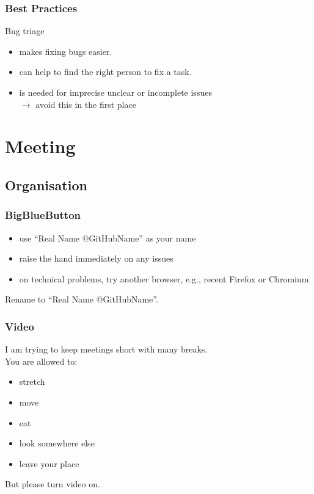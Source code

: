 \begin{frame}
	\frametitle{Best Practices}

	Bug triage
	\begin{itemize}
		\item makes fixing bugs easier.
		\item can help to find the right person to fix a task.
		\item is needed for imprecise unclear or incomplete issues \\
			$\rightarrow$ avoid this in the first place
	\end{itemize}
\end{frame}

\section{Meeting}

\subsection{Organisation}

\begin{frame}
	\frametitle{BigBlueButton}
	\begin{itemize}
		\item use ``Real Name @GitHubName'' as your name
		\item raise the hand immediately on any issues
		\item on technical problems, try another browser, e.g., recent Firefox or Chromium
	\end{itemize}

	\begin{task}
	Rename to ``Real Name @GitHubName''.
	\end{task}
\end{frame}

\begin{assignment}
	\frametitle{Video}
	I am trying to keep meetings short with many breaks. \\
	You are allowed to:
	\begin{itemize}
		\item stretch
		\item move
		\item eat
		\item look somewhere else
		\item leave your place
	\end{itemize}

	\begin{task}
	But please turn video on.
	\end{task}
\end{assignment}

